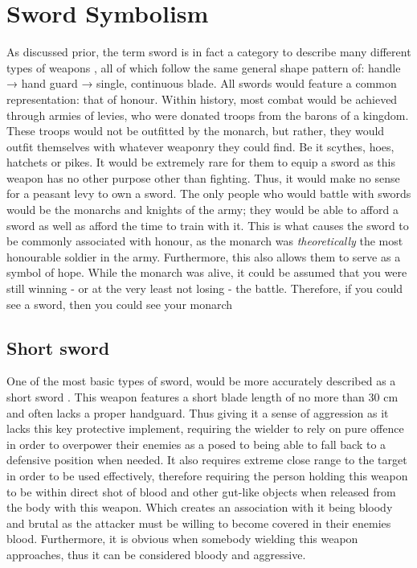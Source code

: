 \documentclass{article}
\begin{document}
\pagebreak

\pagebreak

\section{Sword Symbolism} \label{swordSymbol}
As discussed prior, the term sword is in fact a category to describe many different types of weapons \parencite{furat1998brief}, all of which follow the same general shape pattern of: handle → hand guard → single, continuous blade.
All swords would feature a common representation: that of honour. Within history, most combat would be achieved through armies of levies, who were donated troops from the barons of a kingdom. These troops would not be outfitted by the monarch, but rather, they would outfit themselves with whatever weaponry they could find. Be it scythes, hoes, hatchets or pikes. It would be extremely rare for them to equip a sword as this weapon has no other purpose other than fighting. Thus, it would make no sense for a peasant levy to own a sword. The only people who would battle with swords would be the monarchs and knights of the army; they would be able to afford a sword as well as afford the time to train with it. This is what causes the sword to be commonly associated with honour, as the monarch was \textit{theoretically} the most honourable soldier in the army. Furthermore, this also allows them to serve as a symbol of hope. While the monarch was alive, it could be assumed that you were still winning - or at the very least not losing - the battle. Therefore, if you could see a sword, then you could see your monarch

\subsection{Short sword} \label{shortSwordSymbol}
One of the most basic types of sword, would be more accurately described as a short sword \parencite{mcnab2010swords}. This weapon features a short blade length of no more than 30 cm and often lacks a proper handguard. Thus giving it a sense of aggression as it lacks this key protective implement, requiring the wielder to rely on pure offence in order to overpower their enemies as a posed to being able to fall back to a defensive position when needed. It also requires extreme close range to the target in order to be used effectively, therefore requiring the person holding this weapon to be within direct shot of blood and other gut-like objects when released from the body with this weapon. Which creates an association with it being bloody and brutal as the attacker must be willing to become covered in their enemies blood. Furthermore, it is obvious when somebody wielding this weapon approaches, thus it can be considered bloody and aggressive.
\end{document}
